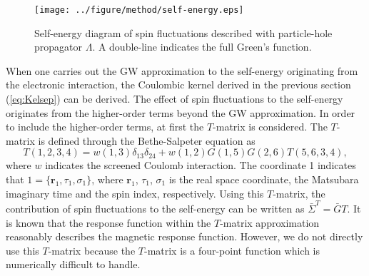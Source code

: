 \begin{figure} %
	\centering
	\texttt{[image: ../figure/method/self-energy.eps]}
	\caption{Self-energy diagram of spin fluctuations described with particle-hole propagator $\Lambda$. A double-line indicates the full Green's function.}
	\label{fig:SF-self}
\end{figure}
When one carries out the GW approximation to the self-energy originating from the electronic interaction,
the Coulombic kernel derived in the previous section (\ref{eq:Kelsep}) can be derived.
The effect of spin fluctuations to the self-energy originates from the higher-order terms beyond the
GW approximation.
In order to include the higher-order terms, at first the $T$-matrix\cite{Gordon1961,Ersoy2010} is considered.
The $T$-matrix is defined through the Bethe-Salpeter equation\cite{BSE1951} as
%
\begin{equation}
	T(1,2,3,4) = w(1,3)\delta_{13}\delta_{24} + 
	w(1,2)G(1,5)G(2,6)T(5,6,3,4),
	\label{eq:T-BSE}
\end{equation}
%
where $w$ indicates the screened Coulomb interaction.
The coordinate 1 indicates that $1=\{\bm r_1, \tau_1, \sigma_1\}$, 
where $\bm r_1$, $\tau_1$, $\sigma_1$ is the real space coordinate,
the Matsubara imaginary time and the spin index, respectively.
Using this $T$-matrix, the contribution of spin fluctuations to the self-energy can be written as $\bar{\Sigma}^{T}=\bar{G}T$.
It is known that the response function within the $T$-matrix approximation reasonably describes the magnetic response function\cite{Ersoy2010,Onida2002}.
However, we do not directly use this $T$-matrix because the $T$-matrix is a four-point function
which is numerically difficult to handle.

